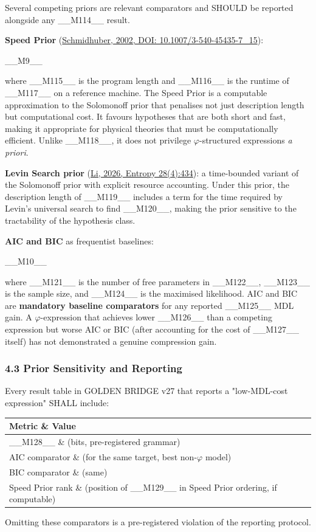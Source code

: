 Several competing priors are relevant comparators and SHOULD be reported alongside any \_\_M114\_\_ result.

\textbf{Speed Prior} (\href{https://doi.org/10.1007/3-540-45435-7\_15}{Schmidhuber, 2002, DOI: 10.1007/3-540-45435-7\_15}):

\_\_M9\_\_

where \_\_M115\_\_ is the program length and \_\_M116\_\_ is the runtime of \_\_M117\_\_ on a reference machine. The Speed Prior is a computable approximation to the Solomonoff prior that penalises not just description length but computational cost. It favours hypotheses that are both short and fast, making it appropriate for physical theories that must be computationally efficient. Unlike \_\_M118\_\_, it does not privilege $\varphi$-structured expressions \textit{a priori}.

\textbf{Levin Search prior} (\href{https://doi.org/10.3390/e28040434}{Li, 2026, Entropy 28(4):434}): a time-bounded variant of the Solomonoff prior with explicit resource accounting. Under this prior, the description length of \_\_M119\_\_ includes a term for the time required by Levin's universal search to find \_\_M120\_\_, making the prior sensitive to the tractability of the hypothesis class.

\textbf{AIC and BIC} as frequentist baselines:

\_\_M10\_\_

where \_\_M121\_\_ is the number of free parameters in \_\_M122\_\_, \_\_M123\_\_ is the sample size, and \_\_M124\_\_ is the maximised likelihood. AIC and BIC are \textbf{mandatory baseline comparators} for any reported \_\_M125\_\_ MDL gain. A $\varphi$-expression that achieves lower \_\_M126\_\_ than a competing expression but worse AIC or BIC (after accounting for the cost of \_\_M127\_\_ itself) has not demonstrated a genuine compression gain.

\subsubsection{4.3 Prior Sensitivity and Reporting}

Every result table in GOLDEN BRIDGE v27 that reports a "low-MDL-cost expression" SHALL include:

\begin{tabular}{|l|l|}
\hline
Metric \& Value \\
\hline
\_\_M128\_\_ \& (bits, pre-registered grammar) \\
AIC comparator \& (for the same target, best non-$\varphi$ model) \\
BIC comparator \& (same) \\
Speed Prior rank \& (position of \_\_M129\_\_ in Speed Prior ordering, if computable) \\
\hline
\end{tabular}
Omitting these comparators is a pre-registered violation of the reporting protocol.

